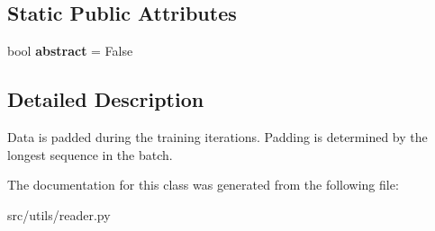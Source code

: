 \subsection*{Static Public Attributes}
\begin{DoxyCompactItemize}
\item 
bool {\bfseries abstract} = False\hypertarget{classreader_1_1PostPadding_abd3064900bc2e2cf5e55d256c1016382}{}\label{classreader_1_1PostPadding_abd3064900bc2e2cf5e55d256c1016382}

\end{DoxyCompactItemize}


\subsection{Detailed Description}
\begin{DoxyVerb}Data is padded during the training iterations. Padding is determined by the longest
sequence in the batch.
\end{DoxyVerb}
 

The documentation for this class was generated from the following file\+:\begin{DoxyCompactItemize}
\item 
src/utils/reader.\+py\end{DoxyCompactItemize}
